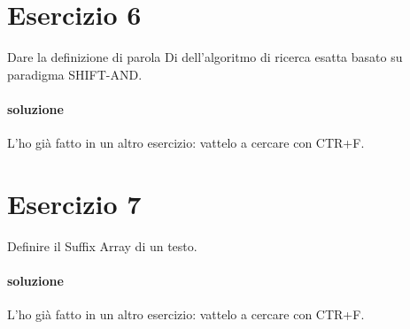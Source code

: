 \section{Esercizio 6}

Dare la definizione di parola Di dell'algoritmo di ricerca esatta basato su paradigma SHIFT-AND.

\paragraph{soluzione} L'ho gi\`a fatto in un altro esercizio: vattelo a cercare con CTR+F.

\section{Esercizio 7}

Definire il Suffix Array di un testo.

\paragraph{soluzione} L'ho gi\`a fatto in un altro esercizio: vattelo a cercare con CTR+F.
